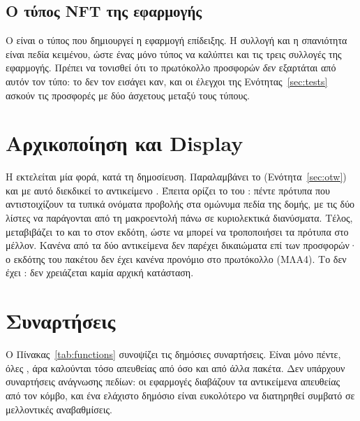 \subsection{Ο τύπος NFT της εφαρμογής}



Ο  είναι ο τύπος που δημιουργεί η εφαρμογή επίδειξης. Η συλλογή και
η σπανιότητα είναι πεδία κειμένου, ώστε ένας μόνο τύπος να καλύπτει και τις τρεις συλλογές
της εφαρμογής. Πρέπει να τονισθεί ότι το πρωτόκολλο προσφορών \emph{δεν} εξαρτάται από
αυτόν τον τύπο: το  δεν τον εισάγει καν, και οι έλεγχοι της
Ενότητας~\ref{sec:tests} ασκούν τις προσφορές με δύο άσχετους μεταξύ τους τύπους.

\section{Αρχικοποίηση και Display}
\label{sec:init}



Η  εκτελείται μία φορά, κατά τη δημοσίευση. Παραλαμβάνει το   (Ενότητα~\ref{sec:otw}) και με αυτό διεκδικεί το
αντικείμενο . Έπειτα ορίζει το  του :
πέντε πρότυπα που αντιστοιχίζουν τα τυπικά ονόματα προβολής στα ομώνυμα πεδία της δομής,
με τις δύο λίστες να παράγονται από τη μακροεντολή  πάνω σε κυριολεκτικά
διανύσματα. Τέλος, μεταβιβάζει το  και το  στον εκδότη, ώστε
να μπορεί να τροποποιήσει τα πρότυπα στο μέλλον. Κανένα από τα δύο αντικείμενα δεν
παρέχει δικαιώματα επί των προσφορών· ο εκδότης του πακέτου δεν έχει κανένα προνόμιο στο
πρωτόκολλο (ΜΛΑ4). Το  δεν έχει : δεν χρειάζεται καμία αρχική
κατάσταση.

\section{Συναρτήσεις}
\label{sec:functions}

Ο Πίνακας~\ref{tab:functions} συνοψίζει τις δημόσιες συναρτήσεις. Είναι μόνο πέντε, όλες
, άρα καλούνται τόσο απευθείας από  όσο και από άλλα πακέτα. Δεν
υπάρχουν συναρτήσεις ανάγνωσης πεδίων: οι εφαρμογές διαβάζουν τα αντικείμενα απευθείας από
τον κόμβο, και ένα ελάχιστο δημόσιο  είναι ευκολότερο να διατηρηθεί συμβατό σε
μελλοντικές αναβαθμίσεις.


